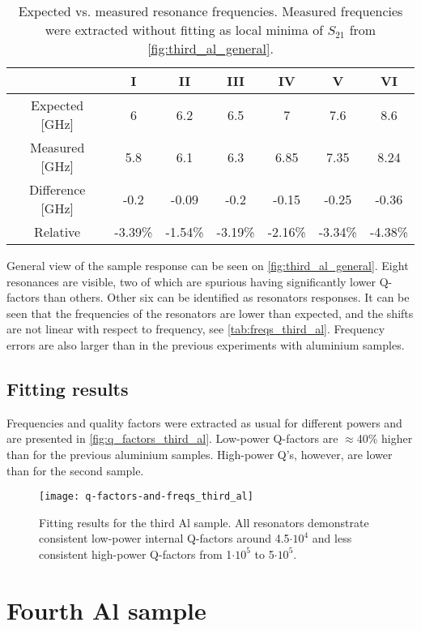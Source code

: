 \documentclass[12pt]{article}
\numberwithin{equation}{section}
\begin{document}
\begin{table}[h]
\centering
\bgroup
\def\arraystretch{1.5}%
\begin{tabular}{c|*{6}{c}}
  & I & II & III & IV & V & VI\\
\hline
Expected [GHz]& 6 & 6.2 & 6.5 & 7 & 7.6 & 8.6 \\
Measured [GHz] & 5.8 &  6.1 & 6.3 & 6.85 &  7.35 &  8.24 \\
Difference [GHz]&  -0.2 & -0.09& -0.2 & -0.15& -0.25& -0.36 \\
Relative & -3.39\%& -1.54\%& -3.19\%& -2.16\%& -3.34\%& -4.38\%
\end{tabular}
\egroup
\caption{Expected vs. measured resonance frequencies. Measured frequencies were extracted without fitting as local minima of $S_{21}$ from \autoref{fig:third_al_general}.}
\label{tab:freqs_third_al}
\end{table}

General view of the sample response can be seen on \autoref{fig:third_al_general}. Eight resonances are visible, two of which are spurious having significantly lower Q-factors than others. Other six can be identified as resonators responses. It can be seen that the frequencies of the resonators are lower than expected, and the shifts are not linear with respect to frequency, see \autoref{tab:freqs_third_al}. Frequency errors are also larger than in the previous experiments with aluminium samples.


\subsection{Fitting results}

Frequencies and quality factors were extracted as usual for different powers and are presented in \autoref{fig:q_factors_third_al}. Low-power Q-factors are $\approx$40\% higher than for the previous aluminium samples. High-power Q's, however, are lower than for the second sample. 

\begin{figure}[h]
\centering
\texttt{[image: q-factors-and-freqs\_third\_al]}
\caption{Fitting results for the third Al sample. All resonators demonstrate consistent low-power internal Q-factors around 4.5$\cdot 10^4$ and less consistent high-power Q-factors from 1$\cdot 10^5$ to 5$\cdot 10^5$.}
\label{fig:q_factors_third_al}
\end{figure}

\section{Fourth Al sample}
\end{document}
